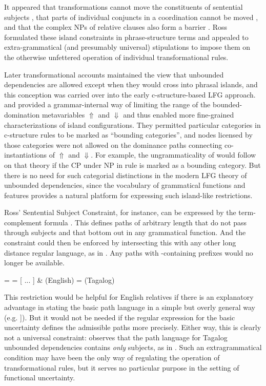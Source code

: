 \documentclass[output=paper,hidelinks]{langscibook}
\begin{document}
\noindent  It appeared that transformations cannot move the constituents of sentential subjects , that parts of individual conjuncts in a coordination cannot be moved , and that the complex NPs of relative clauses also form a barrier . Ross formulated these island constraints in phrase-structure terms and appealed to extra-grammatical (and presumably universal) stipulations to impose them on the otherwise unfettered operation of individual transformational rules.

Later transformational accounts maintained the view that unbounded dependencies are allowed except when they would cross into phrasal islands, and this conception was carried over into the early c-structure-based LFG approach.  \citet{kaplanbresnan82} and \citet{zaenen1983} provided a grammar-internal way of limiting the range of the bounded-domination metavariables $\Uparrow$ and $\Downarrow$ and thus enabled more fine-grained characterizations of island configurations. They permitted particular categories in c-structure rules to be marked as ``bounding categories'', and nodes licensed by those categories were not allowed on the dominance paths connecting co-instantiations of $\Uparrow$ and $\Downarrow$. For example, the ungrammaticality of  would follow on that theory if the CP under NP in rule  is marked as a bounding category.  But there is no need for such categorial distinctions in the modern LFG theory of unbounded dependencies, since the vocabulary of grammatical functions and features provides a natural platform for expressing such island-like restrictions.  

Ross' Sentential Subject Constraint, for instance, can be expressed by the term-complement formula .  This defines paths of arbitrary length that do not pass through subjects and that bottom out in any grammatical function.  And the constraint could then be enforced by intersecting this with any other long distance regular language, as in . Any paths with \SUBJ-containing prefixes would no longer be available.

\ea\label{ssc}
\ea\label{ssca}  = 
\ex\label{ssb}  = [ ... ] \&  \hsp{1em}(English)
\ex\label{tagalog}  = \kplus  \hsp{3em}(Tagalog)
\z\z

\noindent  This restriction would be helpful for English relatives if there is an explanatory advantage in stating the basic path language in a simple but overly general way (e.g. \attr{[gf\kstar \termcomp{comp}}]). But it would not be needed if the regular expression for the basic uncertainty defines the admissible paths more precisely.   Either way, this is clearly not a universal constraint:  \citet{Kroeger93} observes that the path language for Tagalog unbounded dependencies contains \textit{only} subjects, as in .  Such an extragrammatical condition may have been the only way of regulating the operation of transformational rules, but it serves no particular purpose in the setting of functional uncertainty.
\end{document}
